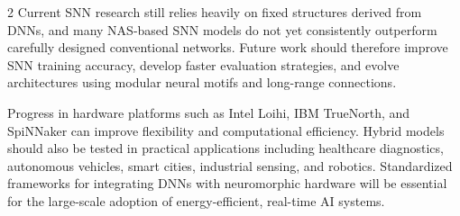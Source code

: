 \begin{multicols}{2}
  \noindent
  Current SNN research still relies heavily on fixed structures derived from DNNs, and many NAS-based SNN models do not yet consistently outperform carefully designed conventional networks. Future work should therefore improve SNN training accuracy, develop faster evaluation strategies, and evolve architectures using modular neural motifs and long-range connections.

  \noindent
  Progress in hardware platforms such as Intel Loihi, IBM TrueNorth, and SpiNNaker can improve flexibility and computational efficiency. Hybrid models should also be tested in practical applications including healthcare diagnostics, autonomous vehicles, smart cities, industrial sensing, and robotics. Standardized frameworks for integrating DNNs with neuromorphic hardware will be essential for the large-scale adoption of energy-efficient, real-time AI systems.


\end{multicols}
